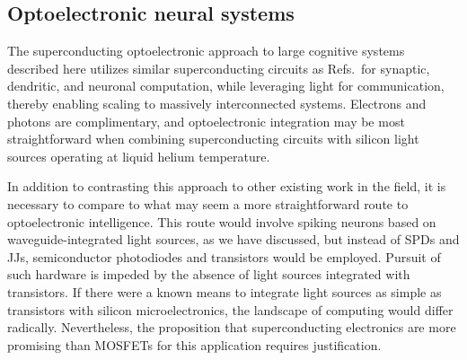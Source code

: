 \documentclass[twocolumn]{article}
\newcommand{\onlinecite}[1]{\hspace{-1 ex} \nocite{#1}\citenum{#1}}
\begin{document}
\subsection{Optoelectronic neural systems}
The superconducting optoelectronic approach to large cognitive systems described here utilizes similar superconducting circuits as Refs.\,\onlinecite{hias2007,sele2017,scdo2018} for synaptic, dendritic, and neuronal computation, while leveraging light for communication, thereby enabling scaling to massively interconnected systems. Electrons and photons are complimentary, and optoelectronic integration may be most straightforward when combining superconducting circuits with silicon light sources operating at liquid helium temperature.

In addition to contrasting this approach to other existing work in the field, it is necessary to compare to what may seem a more straightforward route to optoelectronic intelligence. This route would involve spiking neurons based on waveguide-integrated light sources, as we have discussed, but instead of SPDs and JJs, semiconductor photodiodes and transistors would be employed. Pursuit of such hardware is impeded by the absence of light sources integrated with transistors. If there were a known means to integrate light sources as simple as transistors with silicon microelectronics, the landscape of computing would differ radically. Nevertheless, the proposition that superconducting electronics are more promising than MOSFETs for this application requires justification.
\end{document}
